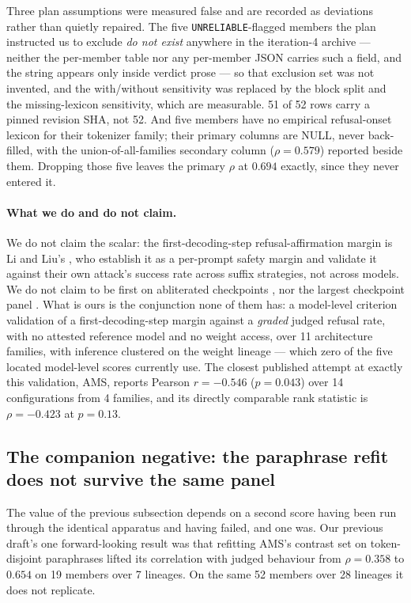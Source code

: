 \documentclass[11pt,letterpaper]{article}
\begin{document}
Three plan assumptions were measured false and are recorded as deviations rather than quietly repaired. The five \texttt{UNRELIABLE}-flagged members the plan instructed us to exclude \emph{do not exist} anywhere in the iteration-4 archive --- neither the per-member table nor any per-member JSON carries such a field, and the string appears only inside verdict prose --- so that exclusion set was not invented, and the with/without sensitivity was replaced by the block split and the missing-lexicon sensitivity, which are measurable. 51 of 52 rows carry a pinned revision SHA, not 52. And five members have no empirical refusal-onset lexicon for their tokenizer family; their primary columns are NULL, never back-filled, with the union-of-all-families secondary column ($\rho = 0.579$) reported beside them. Dropping those five leaves the primary $\rho$ at $0.694$ exactly, since they never entered it.

\paragraph{What we do and do not claim.} We do not claim the scalar: the first-decoding-step refusal-affirmation margin is Li and Liu's \citep{LiLiu2025}, who establish it as a per-prompt safety margin and validate it against their own attack's success rate across suffix strategies, not across models. We do not claim to be first on abliterated checkpoints \citep{Llorente2026}, nor the largest checkpoint panel \citep{Hurtado2026}. What is ours is the conjunction none of them has: a model-level criterion validation of a first-decoding-step margin against a \emph{graded} judged refusal rate, with no attested reference model and no weight access, over 11 architecture families, with inference clustered on the weight lineage --- which zero of the five located model-level scores currently use. The closest published attempt at exactly this validation, AMS, reports Pearson $r = -0.546$ ($p = 0.043$) over 14 configurations from 4 families, and its directly comparable rank statistic is $\rho = -0.423$ at $p = 0.13$.

\subsection{The companion negative: the paraphrase refit does not survive the same panel}
\label{sec:refit}

The value of the previous subsection depends on a second score having been run through the identical apparatus and having failed, and one was. Our previous draft's one forward-looking result was that refitting AMS's contrast set on token-disjoint paraphrases lifted its correlation with judged behaviour from $\rho = 0.358$ to $0.654$ on 19 members over 7 lineages. On the same 52 members over 28 lineages it does not replicate.
\end{document}
